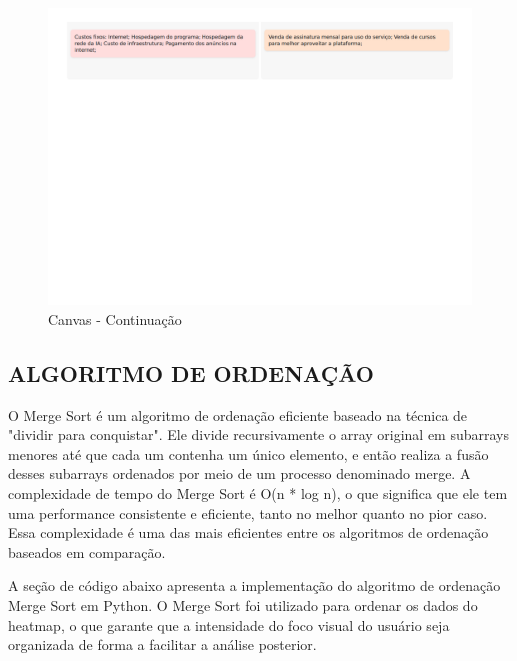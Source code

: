 \begin{figure}[H]
    \centering
    \caption{Canvas - Continuação}%
    \label{fig:pg-canvas2}
    \includegraphics[width=0.72\linewidth]{Illustrations/canvas2.png}
\end{figure}

\subsection*{ALGORITMO DE ORDENAÇÃO}
O Merge Sort é um algoritmo de ordenação eficiente baseado na técnica de "dividir para conquistar". Ele divide recursivamente o array original em subarrays menores até que cada um contenha um único elemento, e então realiza a fusão desses subarrays ordenados por meio de um processo denominado merge. A complexidade de tempo do Merge Sort é O(n * log n), o que significa que ele tem uma performance consistente e eficiente, tanto no melhor quanto no pior caso. Essa complexidade é uma das mais eficientes entre os algoritmos de ordenação baseados em comparação. \textcite{Brunet}

A seção de código abaixo apresenta a implementação do algoritmo de ordenação Merge Sort em Python. O Merge Sort foi utilizado para ordenar os dados do heatmap, o que garante que a intensidade do foco visual do usuário seja organizada de forma a facilitar a análise posterior.

